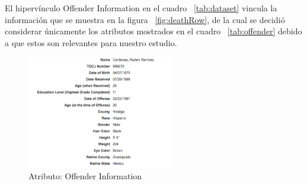 \documentclass[sigconf]{acmart}
\begin{document}
\begin{table}[ht]
\begin{center}
\end{center}
\caption{Listado de atributos del Departamento de Justicia}
\label{tab:dataset}
\end{table}

El hipervínculo Offender Information en el cuadro ~\ref{tab:dataset} vincula la información que se muestra en la figura ~\ref{fig:deathRow}, de la cual se decidió considerar únicamente los atributos mostrados en el cuadro ~\ref{tab:offender} debido a que estos son relevantes para nuestro estudio.


\begin{figure}[ht]
  \centering
  \includegraphics[width=2.5in]{datos.png}
  \caption{Atributo: Offender Information}
\end{figure}
\end{document}
